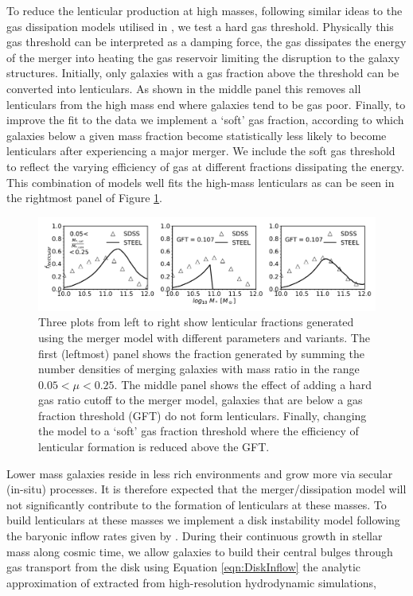 To reduce the lenticular production at high masses, following similar ideas to the gas dissipation models utilised in \citet{Hopkins2009}, we test a hard gas threshold. Physically this gas threshold can be interpreted as a damping force, the gas dissipates the energy of the merger into heating the gas reservoir limiting the disruption to the galaxy structures. Initially, only galaxies with a gas fraction above the threshold can be converted into lenticulars. As shown in the middle panel this removes all lenticulars from the high mass end where galaxies tend to be gas poor. 
Finally, to improve the fit to the data we implement a `soft' gas fraction, according to which galaxies below a given mass fraction become statistically less likely to become lenticulars after experiencing a major merger. We include the soft gas threshold to reflect the varying efficiency of gas at different fractions dissipating the energy. This combination of models well fits the high-mass lenticulars as can be seen in the rightmost panel of Figure \ref{fig:Lentcular_panels}.

\begin{figure}
  \includegraphics[width=\linewidth]{Figures/Chapter5/Lenticular_three.pdf}
    \caption{Three plots from left to right show lenticular fractions generated using the merger model with different parameters and variants. The first (leftmost) panel shows the fraction generated by summing the number densities of merging galaxies with mass ratio in the range $0.05 < \mu < 0.25$. The middle panel shows the effect of adding a hard gas ratio cutoff to the merger model, galaxies that are below a gas fraction threshold (GFT) do not form lenticulars. Finally, changing the model to a `soft' gas fraction threshold where the efficiency of lenticular formation is reduced above the GFT.}
    \label{fig:Lentcular_panels}
\end{figure}

Lower mass galaxies reside in less rich environments and grow more via secular (in-situ) processes. It is therefore expected that the merger/dissipation model will not significantly contribute to the formation of lenticulars at these masses. To build lenticulars at these masses we implement a disk instability model following the baryonic inflow rates given by \citet{Bournaud2011BLACKSTREAMS}. During their continuous growth in stellar mass along cosmic time, we allow galaxies to build their central bulges through gas transport from the disk using Equation \ref{eqn:DiskInflow} the analytic approximation of \citet{Bournaud2011BLACKSTREAMS} extracted from high-resolution hydrodynamic simulations, 


